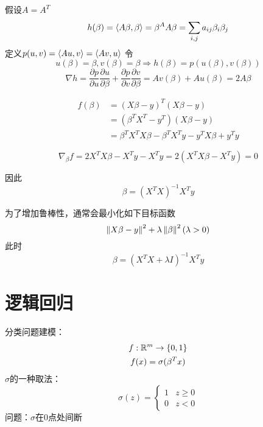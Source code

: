 \documentclass[11pt]{article}
\begin{document}
假设\(A=A^T\)
\begin{equation*}
h(\beta)=\langle A\beta,\beta\rangle=\beta^AA\beta=\sum_{i,j}a_{ij}\beta_i\beta_j
\end{equation*}
定义\(p(u,v)=\langle Au,v\rangle=\langle Av,u\rangle\)
令
\begin{equation*}
u(\beta)=\beta,v(\beta)=\beta\Rightarrow h(\beta)=p(u(\beta),v(\beta))
\end{equation*}
\begin{equation*}
\nabla h=\frac{\partial p}{\partial u}\frac{\partial u}{\partial\beta}+\frac{\partial p}{\partial v}\frac{\partial v}{\partial \beta}=Av(\beta)+Au(\beta)=2A\beta
\end{equation*}

\begin{align*}
f(\beta)&=(X\beta-y)^T(X\beta-y)\\
&=(\beta^TX^T-y^T)(X\beta-y)\\
&=\beta^TX^TX\beta-\beta^TX^Ty-y^TX\beta+y^Ty
\end{align*}

\begin{equation*}
\nabla_\beta f=2X^TX\beta-X^Ty-X^Ty=2(X^TX\beta-X^Ty)=0
\end{equation*}

因此
\begin{equation*}
\beta=(X^TX)^{-1}X^Ty
\end{equation*}

为了增加鲁棒性，通常会最小化如下目标函数
\begin{equation*}
\left\lVert X\beta-y\right\rVert^2+\lambda\left\lVert\beta\right\rVert^2(\lambda>0)
\end{equation*}
此时
\begin{equation*}
\beta=(X^TX+\lambda I)^{-1}X^Ty
\end{equation*}

\section{逻辑回归}
\label{sec:org9c78f73}
分类问题建模：
\begin{gather*}
f:\mathbb{R}^m\to\{0,1\}\\
f(x)=\sigma(\beta^Tx)
\end{gather*}
\(\sigma\)的一种取法：
\begin{equation*}
\sigma(z)=
\begin{cases}
1&z\ge 0\\
0&z<0
\end{cases}
\end{equation*}
问题：\(\sigma\)在0点处间断
\end{document}
